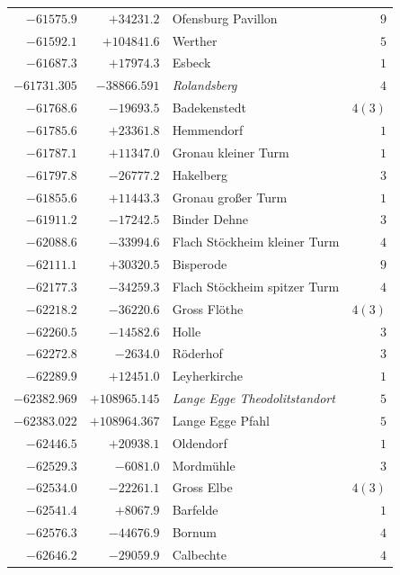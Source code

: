 \begin{center}
\begin{tabular}{r|r|p{170pt}|r}
\(-61575.9\)&\(+34231.2\)&Ofensburg Pavillon&\(9\)\\
\(-61592.1\)&\(+104841.6\)&Werther&\(5\)\\
\(-61687.3\)&\(+17974.3\)&Esbeck&\(1\)\\
\(-61731.305\)&\(-38866.591\)&\textit{Rolandsberg}&\(4\)\\
\(-61768.6\)&\(-19693.5\)&Badekenstedt&\(4 (3)\)\\
\(-61785.6\)&\(+23361.8\)&Hemmendorf&\(1\)\\
\(-61787.1\)&\(+11347.0\)&Gronau kleiner Turm&\(1\)\\
\(-61797.8\)&\(-26777.2\)&Hakelberg&\(3\)\\
\(-61855.6\)&\(+11443.3\)&Gronau großer Turm&\(1\)\\
\(-61911.2\)&\(-17242.5\)&Binder Dehne&\(3\)\\
\(-62088.6\)&\(-33994.6\)&Flach Stöckheim kleiner Turm&\(4\)\\
\(-62111.1\)&\(+30320.5\)&Bisperode&\(9\)\\
\(-62177.3\)&\(-34259.3\)&Flach Stöckheim spitzer Turm&\(4\)\\
\(-62218.2\)&\(-36220.6\)&Gross Flöthe&\(4 (3)\)\\
\(-62260.5\)&\(-14582.6\)&Holle&\(3\)\\
\(-62272.8\)&\(-2634.0\)&Röderhof&\(3\)\\
\(-62289.9\)&\(+12451.0\)&Leyherkirche&\(1\)\\
\(-62382.969\)&\(+108965.145\)&\textit{Lange Egge Theodolitstandort}&\(5\)\\
\(-62383.022\)&\(+108964.367\)&Lange Egge Pfahl&\(5\)\\
\(-62446.5\)&\(+20938.1\)&Oldendorf&\(1\)\\
\(-62529.3\)&\(-6081.0\)&Mordmühle&\(3\)\\
\(-62534.0\)&\(-22261.1\)&Gross Elbe&\(4 (3)\)\\
\(-62541.4\)&\(+8067.9\)&Barfelde&\(1\)\\
\(-62576.3\)&\(-44676.9\)&Bornum&\(4\)\\
\(-62646.2\)&\(-29059.9\)&Calbechte&\(4\)\\
\hline\end{tabular}\endgroup\end{center}
